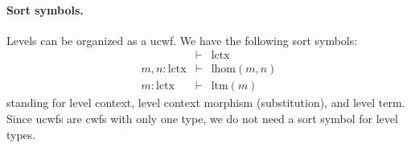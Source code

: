 \documentclass[11pt,a4paper]{article}
\theoremstyle{plain}
\theoremstyle{definition}
\def\lHom{\mathrm{lhom}}
\def\lctx{\mathrm{lctx}}
\def\ltm{\mathrm{ltm}}
\begin{document}
\paragraph{Sort symbols.} Levels can be organized as a ucwf. We have the following sort symbols:
\begin{eqnarray*}
&\vdash& \lctx\\
m, n : \lctx &\vdash& \lHom(m,n)\\
m : \lctx &\vdash& \ltm(m)
\end{eqnarray*}
standing for level context, level context morphism (substitution), and level term.
Since ucwfs are cwfs with only one type, we do not need a sort symbol for level types.
\end{document}
